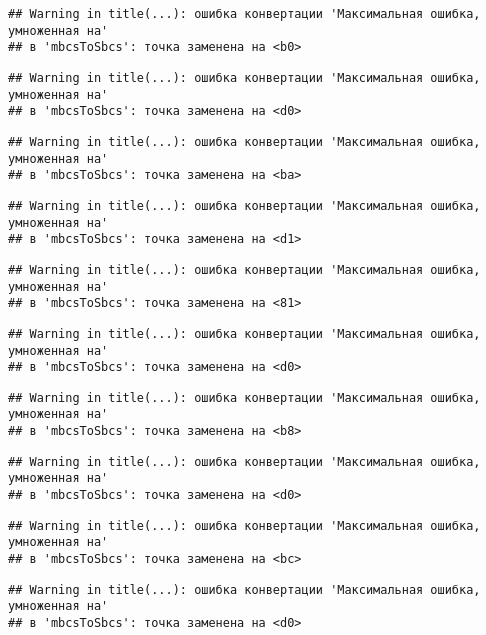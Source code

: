 \documentclass[
]{article}
\begin{document}
\begin{verbatim}
## Warning in title(...): ошибка конвертации 'Максимальная ошибка, умноженная на'
## в 'mbcsToSbcs': точка заменена на <b0>
\end{verbatim}

\begin{verbatim}
## Warning in title(...): ошибка конвертации 'Максимальная ошибка, умноженная на'
## в 'mbcsToSbcs': точка заменена на <d0>
\end{verbatim}

\begin{verbatim}
## Warning in title(...): ошибка конвертации 'Максимальная ошибка, умноженная на'
## в 'mbcsToSbcs': точка заменена на <ba>
\end{verbatim}

\begin{verbatim}
## Warning in title(...): ошибка конвертации 'Максимальная ошибка, умноженная на'
## в 'mbcsToSbcs': точка заменена на <d1>
\end{verbatim}

\begin{verbatim}
## Warning in title(...): ошибка конвертации 'Максимальная ошибка, умноженная на'
## в 'mbcsToSbcs': точка заменена на <81>
\end{verbatim}

\begin{verbatim}
## Warning in title(...): ошибка конвертации 'Максимальная ошибка, умноженная на'
## в 'mbcsToSbcs': точка заменена на <d0>
\end{verbatim}

\begin{verbatim}
## Warning in title(...): ошибка конвертации 'Максимальная ошибка, умноженная на'
## в 'mbcsToSbcs': точка заменена на <b8>
\end{verbatim}

\begin{verbatim}
## Warning in title(...): ошибка конвертации 'Максимальная ошибка, умноженная на'
## в 'mbcsToSbcs': точка заменена на <d0>
\end{verbatim}

\begin{verbatim}
## Warning in title(...): ошибка конвертации 'Максимальная ошибка, умноженная на'
## в 'mbcsToSbcs': точка заменена на <bc>
\end{verbatim}

\begin{verbatim}
## Warning in title(...): ошибка конвертации 'Максимальная ошибка, умноженная на'
## в 'mbcsToSbcs': точка заменена на <d0>
\end{verbatim}
\end{document}
